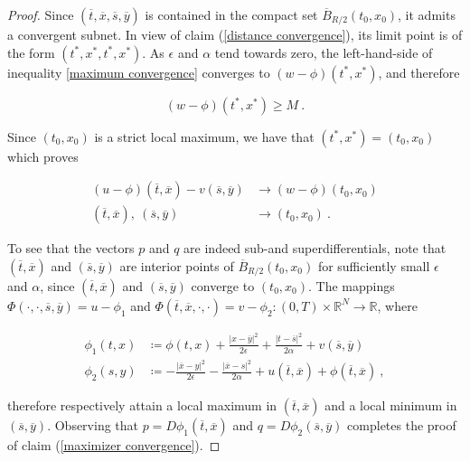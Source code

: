 \begin{lemma}
\begin{proof}
	 		Since $ (\overline{t}, \overline{x}, \overline{s}, \overline{y}) $ is contained in the compact set $ \overline{B}_{R /2}(t_0, x_0) $, it admits a convergent subnet. In view of claim (\ref{distance convergence}), its limit point is of the form $ (t^{*}, x^{*}, t^{*}, x^{*})  $. As $ \epsilon $ and  $ \alpha $ tend towards zero, the left-hand-side of inequality \ref{maximum convergence} converges to $ (w - \phi)(t^{*}, x^{*}) $, and therefore
	 		
	 		\begin{equation*}
	 			(w - \phi)(t^{*}, x^{*}) \geq M \ .
	 		\end{equation*}
	 		
	 		Since $ (t_0, x_0) $ is a strict local maximum, we have that $ (t^{*}, x^{*})  = (t_0, x_0) $ which proves
	 		
	 		\begin{align*}
	 			(u - \phi)(\overline{t}, \overline{x}) - v(\overline{s}, \overline{y}) &\to (w - \phi)(t_0, x_0) \\
	 			(\overline{t}, \overline{x}), \ (\overline{s}, \overline{y}) &\to (t_0, x_0) \ .
	 		\end{align*}
	 		
	 		To see that the vectors $ p $ and $ q $ are indeed sub-and superdifferentials,  note that $ (\overline{t}, \overline{x}) $ and $ (\overline{s}, \overline{y}) $ are interior points of $ \overline{B}_{R / 2}(t_0, x_0) $ for sufficiently small $ \epsilon $ and $ \alpha $, since $ (\overline{t}, \overline{x}) $ and $ (\overline{s}, \overline{y}) $ converge to $ (t_0, x_0) $. The mappings $ \Phi(\cdot, \cdot, \overline{s}, \overline{y}) = u - \phi_1 $ and $ \Phi(\overline{t}, \overline{x}, \cdot, \cdot) =  v - \phi_2 : \left( 0, T \right) \times \mathbb{R}^N \to \mathbb{R} $, where
	 		
	 		\begin{align*}
	 			\phi_1(t, x)  &\coloneqq \phi(t, x) + \frac{\lvert x - \overline{y} \rvert^2}{2 \epsilon} + \frac{\lvert t - \overline{s} \rvert^2}{2 \alpha} + v(\overline{s}, \overline{y}) \\
	 			\phi_2(s, y) &\coloneqq - \frac{\lvert \overline{x} - y \rvert^2}{2 \epsilon} - \frac{\lvert \overline{x} - s \rvert^2}{2 \alpha} + u(\overline{t}, \overline{x}) + \phi(\overline{t}, \overline{x}) \ ,
	 		\end{align*}
	 		
	 		therefore respectively attain a local maximum in $ (\overline{t}, \overline{x}) $ and a local minimum in $ (\overline{s}, \overline{y}) $. Observing that $ p = D\phi_1(\overline{t}, \overline{x}) $ and $ q = D\phi_2(\overline{s}, \overline{y}) $ completes the proof of claim (\ref{maximizer convergence}).
	 		

\end{proof}
\end{lemma}
